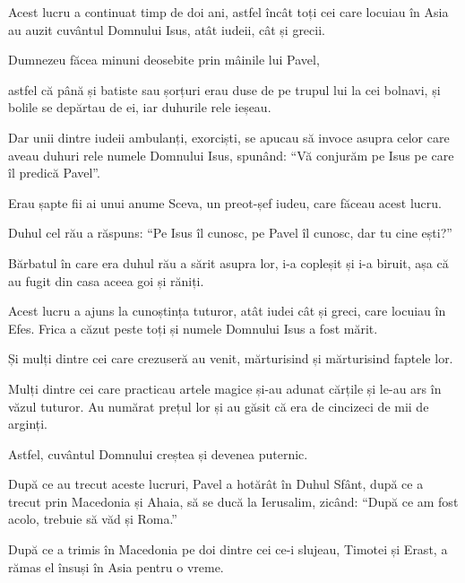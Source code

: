 {Acest lucru a continuat timp de doi ani, astfel încât toți cei care locuiau în Asia au auzit cuvântul Domnului Isus, atât iudeii, cât și grecii.


\par }{\PP {}Dumnezeu făcea minuni deosebite prin mâinile lui Pavel,

astfel că până și batiste sau șorțuri erau duse de pe trupul lui la cei bolnavi, și bolile se depărtau de ei, iar duhurile rele ieșeau.

Dar unii dintre iudeii ambulanți, exorciști, se apucau să invoce asupra celor care aveau duhuri rele numele Domnului Isus, spunând: “Vă conjurăm pe Isus pe care îl predică Pavel”.

Erau șapte fii ai unui anume Sceva, un preot-șef iudeu, care făceau acest lucru.


\par }{\PP {}Duhul cel rău a răspuns: “Pe Isus îl cunosc, pe Pavel îl cunosc, dar tu cine ești?”

Bărbatul în care era duhul rău a sărit asupra lor, i-a copleșit și i-a biruit, așa că au fugit din casa aceea goi și răniți.

Acest lucru a ajuns la cunoștința tuturor, atât iudei cât și greci, care locuiau în Efes. Frica a căzut peste toți și numele Domnului Isus a fost mărit.

Și mulți dintre cei care crezuseră au venit, mărturisind și mărturisind faptele lor.

Mulți dintre cei care practicau artele magice și-au adunat cărțile și le-au ars în văzul tuturor. Au numărat prețul lor și au găsit că era de cincizeci de mii de arginți.

Astfel, cuvântul Domnului creștea și devenea puternic.


\par }{\PP {}După ce au trecut aceste lucruri, Pavel a hotărât în Duhul Sfânt, după ce a trecut prin Macedonia și Ahaia, să se ducă la Ierusalim, zicând: “După ce am fost acolo, trebuie să văd și Roma.”


\par }{\PP {}După ce a trimis în Macedonia pe doi dintre cei ce-i slujeau, Timotei și Erast, a rămas el însuși în Asia pentru o vreme.

}
